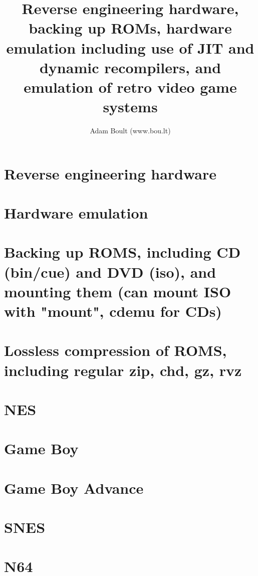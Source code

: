 \documentclass[oneside]{book}
\begin{document}
\author{Adam Boult (www.bou.lt)}
\title{Reverse engineering hardware, backing up ROMs, hardware emulation including use of JIT and dynamic recompilers, and emulation of retro video game systems}
\maketitle

\setcounter{tocdepth}{0}
\tableofcontents



\part{Reverse engineering hardware}

\part{Hardware emulation}


\part{Backing up ROMS, including CD (bin/cue) and DVD (iso), and mounting them (can mount ISO with "mount", cdemu for CDs)}

\part{Lossless compression of ROMS, including regular zip, chd, gz, rvz}

\part{NES}

\part{Game Boy}

\part{Game Boy Advance}

\part{SNES}

\part{N64}
\end{document}
